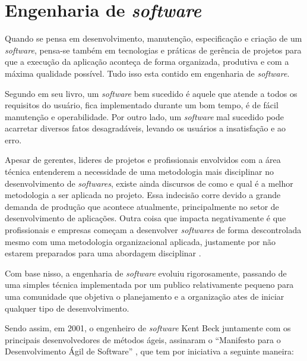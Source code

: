 \section{\textbf{{Engenharia de \textit{software}}}}

Quando se pensa em desenvolvimento, manutenção, especificação e criação de um \textit{software}, pensa-se também em tecnologias e práticas de gerência de projetos para que a execução da aplicação aconteça de forma organizada, produtiva e com a máxima qualidade possível. Tudo isso esta contido em engenharia de \textit{software}.

Segundo  em seu livro, um \textit{software} bem sucedido é aquele que atende a todos os requisitos do usuário, fica implementado durante um bom tempo, é de fácil manutenção e operabilidade. Por outro lado, um \textit{software} mal sucedido pode acarretar diversos fatos desagradáveis, levando os usuários a insatisfação e ao erro. 

Apesar de gerentes, lideres de projetos e profissionais envolvidos com a área técnica entenderem a necessidade de uma metodologia mais disciplinar no desenvolvimento de \textit{softwares}, existe ainda discursos de como e qual é a melhor metodologia a ser aplicada no projeto. Essa indecisão corre devido a grande demanda de produção que acontece atualmente, principalmente no setor de desenvolvimento de aplicações. Outra coisa que impacta negativamente é que profissionais e empresas começam a desenvolver \textit{softwares} de forma descontrolada mesmo com uma metodologia organizacional aplicada, justamente por não estarem preparados para uma abordagem disciplinar \cite{PRESSMAN2016}. 

Com base nisso, a engenharia de \textit{software} evoluiu rigorosamente, passando de uma simples técnica implementada por um publico relativamente pequeno para uma comunidade que objetiva o planejamento e a organização ates de iniciar qualquer tipo de desenvolvimento.

Sendo assim, em 2001, o engenheiro de \textit{software} Kent Beck juntamente com os principais
desenvolvedores de métodos ágeis, assinaram o “Manifesto para o Desenvolvimento Ágil de Software” \cite{SOMMERVILLE2011}, que tem por iniciativa a seguinte maneira:

